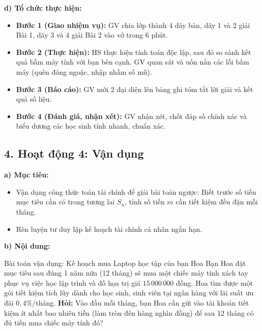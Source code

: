 \documentclass[12pt, a4paper]{article}
\begin{document}
\noindent \textbf{d) Tổ chức thực hiện:}
\begin{itemize}
    \item \textbf{Bước 1 (Giao nhiệm vụ):} GV chia lớp thành 4 dãy bàn, dãy 1 và 2 giải Bài 1, dãy 3 và 4 giải Bài 2 vào vở trong 6 phút.
    \item \textbf{Bước 2 (Thực hiện):} HS thực hiện tính toán độc lập, sau đó so sánh kết quả bấm máy tính với bạn bên cạnh. GV quan sát và uốn nắn các lỗi bấm máy (quên đóng ngoặc, nhập nhầm số mũ).
    \item \textbf{Bước 3 (Báo cáo):} GV mời 2 đại diện lên bảng ghi tóm tắt lời giải và kết quả số liệu.
    \item \textbf{Bước 4 (Đánh giá, nhận xét):} GV nhận xét, chốt đáp số chính xác và biểu dương các học sinh tính nhanh, chuẩn xác.
\end{itemize}

\subsection*{4. Hoạt động 4: Vận dụng}

\noindent \textbf{a) Mục tiêu:}
\begin{itemize}
    \item Vận dụng công thức toán tài chính để giải bài toán ngược: Biết trước số tiền mục tiêu cần có trong tương lai $S_n$, tính số tiền $m$ cần tiết kiệm đều đặn mỗi tháng.
    \item Rèn luyện tư duy lập kế hoạch tài chính cá nhân ngắn hạn.
\end{itemize}

\noindent \textbf{b) Nội dung:}
\begin{pedabox}{Bài toán vận dụng: Kế hoạch mua Laptop học tập của bạn Hoa}
    Bạn Hoa đặt mục tiêu sau đúng 1 năm nữa (12 tháng) sẽ mua một chiếc máy tính xách tay phục vụ việc học lập trình và đồ họa trị giá $15\,000\,000$ đồng. Hoa tìm được một gói tiết kiệm tích lũy dành cho học sinh, sinh viên tại ngân hàng với lãi suất ưu đãi $0{,}4\%$/tháng.
    \textbf{Hỏi:} Vào đầu mỗi tháng, bạn Hoa cần gửi vào tài khoản tiết kiệm ít nhất bao nhiêu tiền (làm tròn đến hàng nghìn đồng) để sau 12 tháng có đủ tiền mua chiếc máy tính đó?
\end{pedabox}
\end{document}
